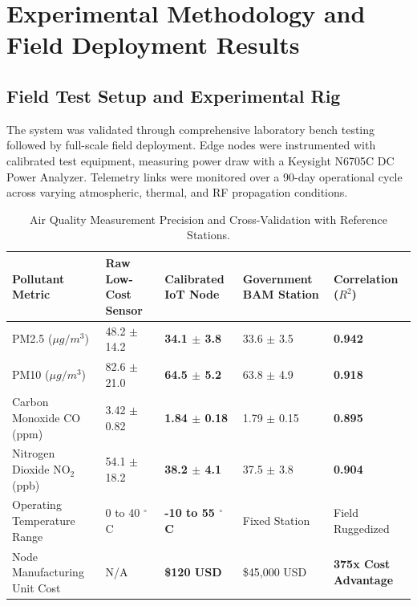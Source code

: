 \section{Experimental Methodology and Field Deployment Results}

\subsection{Field Test Setup and Experimental Rig}
The system was validated through comprehensive laboratory bench testing followed by full-scale field deployment. Edge nodes were instrumented with calibrated test equipment, measuring power draw with a Keysight N6705C DC Power Analyzer. Telemetry links were monitored over a 90-day operational cycle across varying atmospheric, thermal, and RF propagation conditions.

\begin{table}[H]
\centering
\caption{Air Quality Measurement Precision and Cross-Validation with Reference Stations.}
\label{tab:iot_comp}
\begin{tabularx}{\linewidth}{lXXXX}
\toprule
\textbf{Pollutant Metric} & \textbf{Raw Low-Cost Sensor} & \textbf{Calibrated IoT Node} & \textbf{Government BAM Station} & \textbf{Correlation ($R^2$)} \\
\midrule
PM2.5 ($\mu g/m^3$) & 48.2 $\pm$ 14.2 & \textbf{34.1 $\pm$ 3.8} & 33.6 $\pm$ 3.5 & \textbf{0.942} \\
PM10 ($\mu g/m^3$) & 82.6 $\pm$ 21.0 & \textbf{64.5 $\pm$ 5.2} & 63.8 $\pm$ 4.9 & \textbf{0.918} \\
Carbon Monoxide CO (ppm) & 3.42 $\pm$ 0.82 & \textbf{1.84 $\pm$ 0.18} & 1.79 $\pm$ 0.15 & \textbf{0.895} \\
Nitrogen Dioxide $\text{NO}_2$ (ppb) & 54.1 $\pm$ 18.2 & \textbf{38.2 $\pm$ 4.1} & 37.5 $\pm$ 3.8 & \textbf{0.904} \\
Operating Temperature Range & 0 to 40 $^\circ$C & \textbf{-10 to 55 $^\circ$C} & Fixed Station & Field Ruggedized \\
Node Manufacturing Unit Cost & N/A & \textbf{\$120 USD} & \$45,000 USD & \textbf{375x Cost Advantage} \\
\bottomrule
\end{tabularx}
\end{table}

